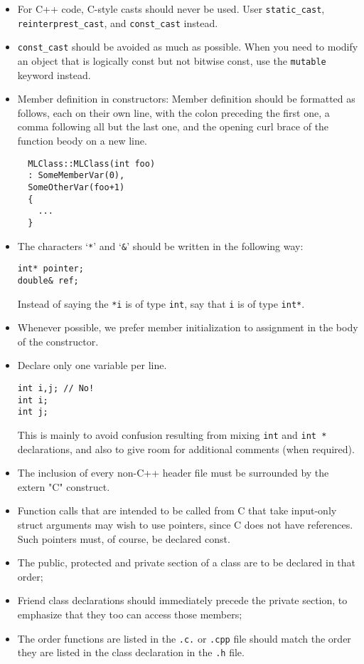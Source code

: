 \documentclass[10pt,letter,relax]{SANDreport}
\begin{document}
\begin{itemize}
\item For C++ code, C-style casts should never be used. User
  \verb!static_cast!, \verb!reinterprest_cast!, and \verb!const_cast! instead.
\item \verb!const_cast! should be avoided as much as possible. When you need
to modify an object that is logically const but not bitwise const, use the
\verb!mutable! keyword instead.
\item Member definition in constructors: Member definition should be formatted
  as follows, each on their own line, with the colon preceding the first one,
a comma following all but the last one, and the opening curl brace of the
  function beody on a new line.
  \begin{verbatim}
  MLClass::MLClass(int foo)
  : SomeMemberVar(0),
  SomeOtherVar(foo+1)
  {
    ...
  }    
  \end{verbatim}
\item The characters `\verb!*!' and `\verb!&!' should be
written in the following way:
\begin{verbatim}
int* pointer;
double& ref;
\end{verbatim}
Instead of saying the \verb!*i! is of type \verb!int!, say that \verb!i! is of
  type \verb!int*!.
\item Whenever possible, we prefer member initialization to assignment in the
  body of the constructor.
\item Declare only one variable per line.
\begin{verbatim}
int i,j; // No!
int i;
int j;
\end{verbatim}
This is mainly to avoid confusion resulting from mixing \verb!int! and
  \verb!int *! declarations, and also to give room for additional comments
  (when required).
\item The inclusion of every non-C++ header file must be surrounded by
  the extern "C" { } construct.
\item Function calls that are intended to be called from C that take input-only struct arguments may wish to use pointers, since C does not have references. Such pointers must, of course, be declared const.
\item The public, protected and private section of a class are to be declared
  in that order;
\item Friend class declarations should immediately precede the private
  section, to emphasize that they too can access those members;
\item The order functions are listed in the \verb!.c.! or \verb!.cpp! file
  should match the order they are listed in the class declaration in the
  \verb!.h! file.
\end{itemize}
\end{document}
